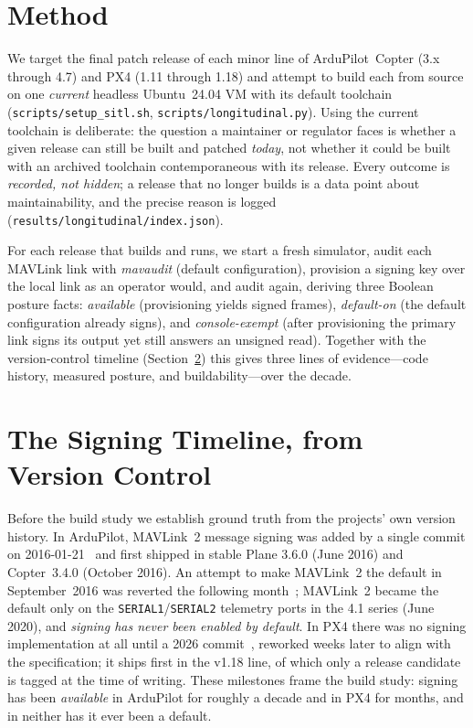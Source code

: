 \documentclass[conference]{IEEEtran}
\newcommand{\code}[1]{\texttt{#1}}
\begin{document}
\section{Method}
\label{sec:method}
We target the final patch release of each minor line of ArduPilot~Copter (3.x
through 4.7) and PX4 (1.11 through 1.18) and attempt to build each from source on
one \emph{current} headless Ubuntu~24.04 VM with its default toolchain
(\code{scripts/setup\_sitl.sh}, \code{scripts/longitudinal.py}). Using the current
toolchain is deliberate: the question a maintainer or regulator faces is whether a
given release can still be built and patched \emph{today}, not whether it could be
built with an archived toolchain contemporaneous with its release. Every outcome
is \emph{recorded, not hidden}; a release that no longer builds is a data point
about maintainability, and the precise reason is logged
(\code{results/longitudinal/index.json}).

For each release that builds and runs, we start a fresh simulator, audit each
MAVLink link with \emph{mavaudit} (default configuration), provision a signing key
over the local link as an operator would, and audit again, deriving three Boolean
posture facts: \emph{available} (provisioning yields signed frames),
\emph{default-on} (the default configuration already signs), and
\emph{console-exempt} (after provisioning the primary link signs its output yet
still answers an unsigned read). Together with the version-control timeline
(Section~\ref{sec:history}) this gives three lines of evidence---code history,
measured posture, and buildability---over the decade.

\section{The Signing Timeline, from Version Control}
\label{sec:history}
Before the build study we establish ground truth from the projects' own version
history. In ArduPilot, MAVLink~2 message signing was added by a single commit on
2016-01-21~\cite{ardupilot_signing_commit} and first shipped in stable Plane
3.6.0 (June 2016) and Copter~3.4.0 (October 2016). An attempt to make MAVLink~2
the default in September~2016 was reverted the following
month~\cite{ardupilot_mavlink2_default}; MAVLink~2 became the default only on
the \code{SERIAL1}/\code{SERIAL2} telemetry ports in the 4.1 series (June 2020),
and \emph{signing has never been enabled by default}. In PX4 there was no signing
implementation at all until a 2026 commit~\cite{px4_signing_pr}, reworked weeks
later to align with the specification; it ships first in the v1.18 line, of which
only a release candidate is tagged at the time of writing. These milestones frame
the build study: signing has been \emph{available} in ArduPilot for roughly a
decade and in PX4 for months, and in neither has it ever been a default.
\end{document}
